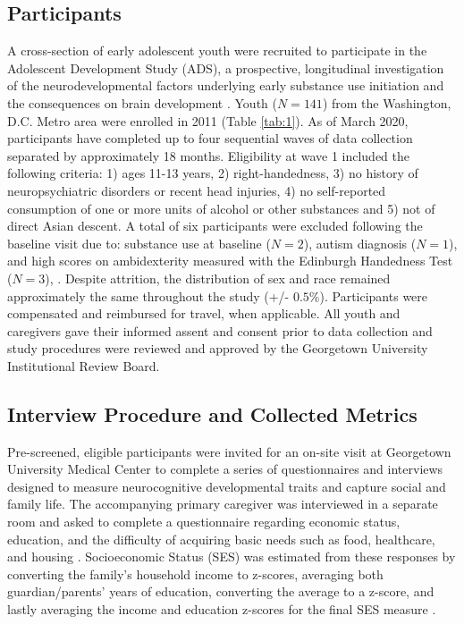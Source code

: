 \documentclass{article}%
\begin{document}
\subsection*{Participants} 
A cross-section of early adolescent youth were recruited to participate in the Adolescent Development Study (ADS), a prospective, longitudinal investigation of the neurodevelopmental factors underlying early substance use initiation and the consequences on brain development \citep{Fishbein2016}. Youth ($N=141$) from the Washington, D.C. Metro area were enrolled in 2011 (Table \ref{tab:1}). As of March 2020, participants have completed up to four sequential waves of data collection separated by approximately 18 months. Eligibility at wave 1 included the following criteria: 1) ages 11-13 years, 2) right-handedness, 3) no history of neuropsychiatric disorders or recent head injuries, 4) no self-reported consumption of one or more units of alcohol or other substances and 5) not of direct Asian descent. A total of six participants were excluded following the baseline visit due to: substance use at baseline ($N=2$), autism diagnosis ($N=1$), and high scores on ambidexterity measured with the Edinburgh Handedness Test ($N=3$), \citep{veale2014edinburgh}. Despite attrition, the distribution of sex and race remained approximately the same throughout the study (+/- $0.5\%$). Participants were compensated and reimbursed for travel, when applicable. All youth and caregivers gave their informed assent and consent prior to data collection and study procedures were reviewed and approved by the Georgetown University Institutional Review Board. 
\subsection*{Interview Procedure and Collected Metrics} Pre-screened, eligible participants were invited for an on-site visit at Georgetown University Medical Center to complete a series of questionnaires and interviews designed to measure neurocognitive developmental traits and capture social and family life. The accompanying primary caregiver was interviewed in a separate room and asked to complete a questionnaire regarding economic status, education, and the difficulty of acquiring basic needs such as food, healthcare, and housing \citep{bornstein2003socioeconomic}. Socioeconomic Status (SES) was estimated from these responses by converting the family’s household income to z-scores, averaging both guardian/parents' years of education, converting the average to a z-score, and lastly averaging the income and education z-scores for the final SES measure \citep{manuck2010ses}.
\end{document}
